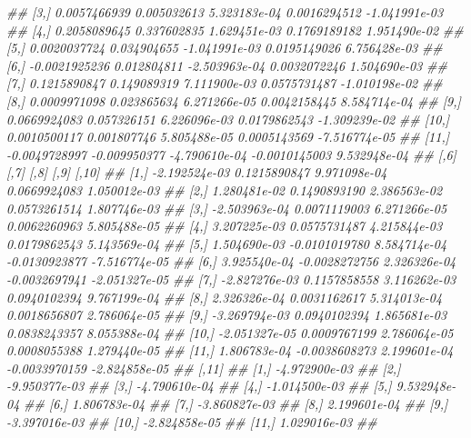 \documentclass[
  10pt,
  krantz2,
  a4paper]{krantz}
\newenvironment{Shaded}{\begin{snugshade}}{\end{snugshade}}
\newcommand{\CommentTok}[1]{\textcolor[rgb]{0.56,0.35,0.01}{\textit{#1}}}
\theoremstyle{definition}
\theoremstyle{definition}
\theoremstyle{definition}
\theoremstyle{remark}
\begin{document}
\begin{Shaded}
\begin{Highlighting}[]
\CommentTok{\#\#  [3,]  0.0057466939  0.005032613  5.323183e{-}04  0.0016294512 {-}1.041991e{-}03}
\CommentTok{\#\#  [4,]  0.2058089645  0.337602835  1.629451e{-}03  0.1769189182  1.951490e{-}02}
\CommentTok{\#\#  [5,]  0.0020037724  0.034904655 {-}1.041991e{-}03  0.0195149026  6.756428e{-}03}
\CommentTok{\#\#  [6,] {-}0.0021925236  0.012804811 {-}2.503963e{-}04  0.0032072246  1.504690e{-}03}
\CommentTok{\#\#  [7,]  0.1215890847  0.149089319  7.111900e{-}03  0.0575731487 {-}1.010198e{-}02}
\CommentTok{\#\#  [8,]  0.0009971098  0.023865634  6.271266e{-}05  0.0042158445  8.584714e{-}04}
\CommentTok{\#\#  [9,]  0.0669924083  0.057326151  6.226096e{-}03  0.0179862543 {-}1.309239e{-}02}
\CommentTok{\#\# [10,]  0.0010500117  0.001807746  5.805488e{-}05  0.0005143569 {-}7.516774e{-}05}
\CommentTok{\#\# [11,] {-}0.0049728997 {-}0.009950377 {-}4.790610e{-}04 {-}0.0010145003  9.532948e{-}04}
\CommentTok{\#\#                [,6]          [,7]         [,8]          [,9]         [,10]}
\CommentTok{\#\#  [1,] {-}2.192524e{-}03  0.1215890847 9.971098e{-}04  0.0669924083  1.050012e{-}03}
\CommentTok{\#\#  [2,]  1.280481e{-}02  0.1490893190 2.386563e{-}02  0.0573261514  1.807746e{-}03}
\CommentTok{\#\#  [3,] {-}2.503963e{-}04  0.0071119003 6.271266e{-}05  0.0062260963  5.805488e{-}05}
\CommentTok{\#\#  [4,]  3.207225e{-}03  0.0575731487 4.215844e{-}03  0.0179862543  5.143569e{-}04}
\CommentTok{\#\#  [5,]  1.504690e{-}03 {-}0.0101019780 8.584714e{-}04 {-}0.0130923877 {-}7.516774e{-}05}
\CommentTok{\#\#  [6,]  3.925540e{-}04 {-}0.0028272756 2.326326e{-}04 {-}0.0032697941 {-}2.051327e{-}05}
\CommentTok{\#\#  [7,] {-}2.827276e{-}03  0.1157858558 3.116262e{-}03  0.0940102394  9.767199e{-}04}
\CommentTok{\#\#  [8,]  2.326326e{-}04  0.0031162617 5.314013e{-}04  0.0018656807  2.786064e{-}05}
\CommentTok{\#\#  [9,] {-}3.269794e{-}03  0.0940102394 1.865681e{-}03  0.0838243357  8.055388e{-}04}
\CommentTok{\#\# [10,] {-}2.051327e{-}05  0.0009767199 2.786064e{-}05  0.0008055388  1.279440e{-}05}
\CommentTok{\#\# [11,]  1.806783e{-}04 {-}0.0038608273 2.199601e{-}04 {-}0.0033970159 {-}2.824858e{-}05}
\CommentTok{\#\#               [,11]}
\CommentTok{\#\#  [1,] {-}4.972900e{-}03}
\CommentTok{\#\#  [2,] {-}9.950377e{-}03}
\CommentTok{\#\#  [3,] {-}4.790610e{-}04}
\CommentTok{\#\#  [4,] {-}1.014500e{-}03}
\CommentTok{\#\#  [5,]  9.532948e{-}04}
\CommentTok{\#\#  [6,]  1.806783e{-}04}
\CommentTok{\#\#  [7,] {-}3.860827e{-}03}
\CommentTok{\#\#  [8,]  2.199601e{-}04}
\CommentTok{\#\#  [9,] {-}3.397016e{-}03}
\CommentTok{\#\# [10,] {-}2.824858e{-}05}
\CommentTok{\#\# [11,]  1.029016e{-}03}
\CommentTok{\#\# }

\end{Highlighting}
\end{Shaded}
\end{document}
